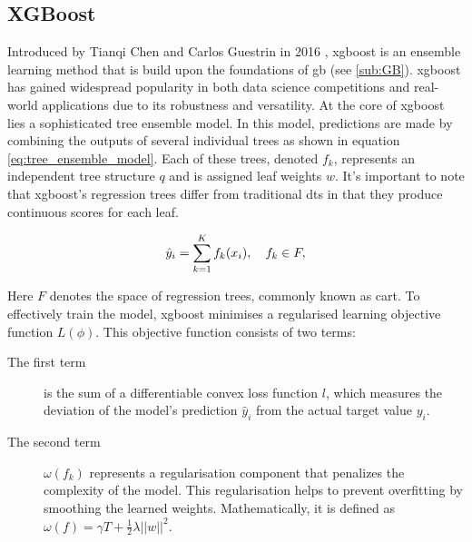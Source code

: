 \subsection{XGBoost}
\label{sub:XGBoost}

Introduced by Tianqi Chen and Carlos Guestrin in 2016 \citep{chen2016xgboost}, \gls{xgboost} is an ensemble learning method that is build upon the foundations of \gls{gb} (see \ref{sub:GB}). \gls{xgboost} has gained widespread popularity in both data science competitions and real-world applications due to its robustness and versatility.
\newline
\newline
At the core of \gls{xgboost} lies a sophisticated tree ensemble model. In this model, predictions are made by combining the outputs of several individual trees as shown in equation \ref{eq:tree_ensemble_model}. Each of these trees, denoted $f_k$, represents an independent tree structure $q$ and is assigned leaf weights $w$. It's important to note that \gls{xgboost}'s regression trees differ from traditional \glspl{dt} in that they produce continuous scores for each leaf.

\begin{equation}
    \centering
    \hat{y}_i = \sum_{k=1}^K f_k(x_i), \quad f_k \in F,
    \label{eq:tree_ensemble_model}
\end{equation}

\noindent
Here $F$ denotes the space of regression trees, commonly known as \gls{cart}.
\newline
\newline
To effectively train the model, \gls{xgboost} minimises a regularised learning objective function $L(\phi)$. This objective function consists of two terms:

\begin{description}
   \item[The first term] is the sum of a differentiable convex loss function $l$, which measures the deviation of the model's prediction $\hat{y}_i$ from the actual target value $y_i$.
   \item[The second term] $\omega(f_k)$ represents a regularisation component that penalizes the complexity of the model. This regularisation helps to prevent overfitting by smoothing the learned weights. Mathematically, it is defined as $\omega(f) = \gamma T + \frac{1}{2} \lambda ||w||^2$.
\end{description}

